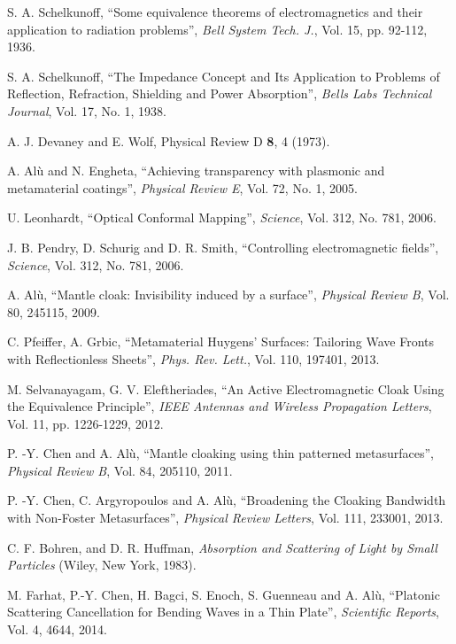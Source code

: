 \documentclass[reprint, showpacs, amsmath,amssymb, aps,
prb]{revtex4-1}
\begin{document}
\begin{thebibliography}{99}

S. A. Schelkunoff, ``Some equivalence theorems of electromagnetics and their application to radiation problems'', {\em Bell System Tech. J.}, Vol. 15, pp. 92-112, 1936.

S. A. Schelkunoff, ``The Impedance Concept and Its Application to Problems of Reflection, Refraction, Shielding and Power Absorption'', {\em Bells Labs Technical Journal}, Vol. 17, No.  1, 1938.


A. J. Devaney and E. Wolf, Physical Review D  \textbf{8}, 4 (1973).

A. Alù and N. Engheta, ``Achieving transparency with plasmonic and metamaterial coatings'', {\em Physical Review E}, Vol. 72, No. 1, 2005.

U. Leonhardt, ``Optical Conformal Mapping'', {\em Science}, Vol. 312, No. 781, 2006.

J. B. Pendry, D. Schurig and D. R. Smith, ``Controlling electromagnetic fields'', {\em Science}, Vol. 312, No. 781, 2006.


A. Alù, ``Mantle cloak: Invisibility induced by a surface'', {\em Physical Review B}, Vol. 80, 245115, 2009.

C. Pfeiffer, A. Grbic, ``Metamaterial Huygens’ Surfaces: Tailoring Wave Fronts with Reflectionless Sheets'', {\em Phys. Rev. Lett.}, Vol. 110, 197401, 2013.

M. Selvanayagam, G. V. Eleftheriades, ``An Active Electromagnetic Cloak Using the Equivalence Principle'', {\em IEEE Antennas and Wireless Propagation Letters}, Vol. 11, pp. 1226-1229, 2012.

P. -Y. Chen and A. Alù, ``Mantle cloaking using thin patterned metasurfaces'', {\em Physical Review B}, Vol. 84, 205110, 2011.

P. -Y. Chen, C. Argyropoulos and A. Alù, ``Broadening the Cloaking Bandwidth with Non-Foster Metasurfaces'',  {\em Physical Review Letters}, Vol. 111, 233001, 2013.

C. F. Bohren, and D. R. Huffman, {\em Absorption and Scattering of Light by Small Particles} (Wiley, New
York, 1983).

M. Farhat, P.-Y. Chen, H. Bagci, S. Enoch, S. Guenneau and A. Alù, ``Platonic Scattering Cancellation for Bending Waves in a Thin Plate'', {\em Scientific Reports}, Vol. 4, 4644, 2014.


\end{thebibliography}
\end{document}
